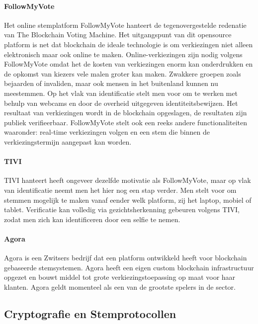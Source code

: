 				\paragraph{FollowMyVote}
					Het online stemplatform FollowMyVote hanteert de tegenovergestelde redenatie van The Blockchain Voting Machine. Het uitgangspunt van dit opensource platform is net dat blockchain de ideale technologie is om verkiezingen niet alleen elektronisch maar ook online te maken. Online-verkiezingen zijn nodig volgens FollowMyVote omdat het de kosten van verkiezingen enorm kan onderdrukken en de opkomst van kiezers vele malen groter kan maken.  Zwakkere groepen zoals bejaarden of invaliden, maar ook mensen in het buitenland kunnen nu  meestemmen.  Op het vlak van identificatie stelt men voor om te werken met behulp van webcams en door de overheid uitgegeven identiteitsbewijzen. Het resultaat van verkiezingen wordt in de blockchain opgeslagen, de resultaten zijn publiek verifieerbaar. FollowMyVote stelt ook een reeks andere functionaliteiten waaronder: real-time verkiezingen volgen en een stem die binnen de verkiezingstermijn aangepast kan worden. 
				\paragraph{TIVI}
					TIVI hanteert heeft ongeveer dezelfde motivatie als FollowMyVote, maar op vlak van identificatie neemt men het hier nog een stap verder. Men stelt voor om stemmen mogelijk te maken vanaf eender welk platform, zij het laptop, mobiel of tablet. Verificatie kan volledig via gezichtsherkenning gebeuren volgens TIVI, zodat men zich kan identificeren door een selfie te nemen.
				\paragraph{Agora}
					Agora is een Zwitsers bedrijf dat een platform ontwikkeld heeft voor blockchain gebaseerde stemsystemen. Agora heeft een eigen custom blockchain infrastructuur opgezet en bouwt middel tot grote verkiezingstoepassing op maat voor haar klanten. Agora geldt momenteel als een van de grootste spelers in de sector.
	\subsection{Cryptografie en Stemprotocollen}
